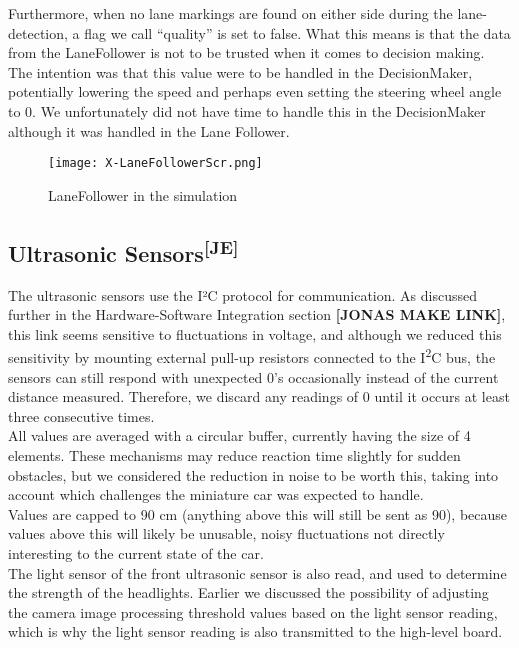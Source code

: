 \noindent
Furthermore, when no lane markings are found on either side during the
lane-detection, a flag we call “quality” is set to false. What this means is
that the data from the LaneFollower is not to be trusted when it comes to
decision making. The intention was that this value were to be handled in the
DecisionMaker, potentially lowering the speed and perhaps even setting the
steering wheel angle to 0. We unfortunately did not have time to handle this in
the DecisionMaker although it was handled in the Lane Follower.
\begin{figure}[ht]
  \centering
  \texttt{[image: X-LaneFollowerScr.png]}
  \caption{LaneFollower in the simulation}
  \label{lfsim}
\end{figure}


\newpage
\subsection[Ultrasonic Sensors]{Ultrasonic Sensors\textsuperscript{[JE]}}
The ultrasonic sensors use the I²C protocol for communication. As discussed
further in the Hardware-Software Integration section \textbf{[JONAS MAKE LINK]},
this link seems sensitive to fluctuations in voltage, and although we reduced
this sensitivity by mounting external pull-up resistors connected to the
I\textsuperscript{2}C bus, the sensors can still respond with unexpected 0's
occasionally instead of the current distance measured. Therefore, we discard any
readings of 0 until it occurs at least three consecutive times.\\

\noindent
All values are averaged with a circular buffer, currently having the size of 4
elements. These mechanisms may reduce reaction time slightly for sudden
obstacles, but we considered the reduction in noise to be worth this, taking
into account which challenges the miniature car was expected to handle.\\

\noindent
Values are capped to 90 cm (anything above this will still be sent as 90),
because values above this will likely be unusable, noisy fluctuations not
directly interesting to the current state of the car.\\

\noindent
The light sensor of the front ultrasonic sensor is also read, and used to
determine the strength of the headlights. Earlier we discussed the possibility
of adjusting the camera image processing threshold values based on the light
sensor reading, which is why the light sensor reading is also transmitted to the
high-level board.

